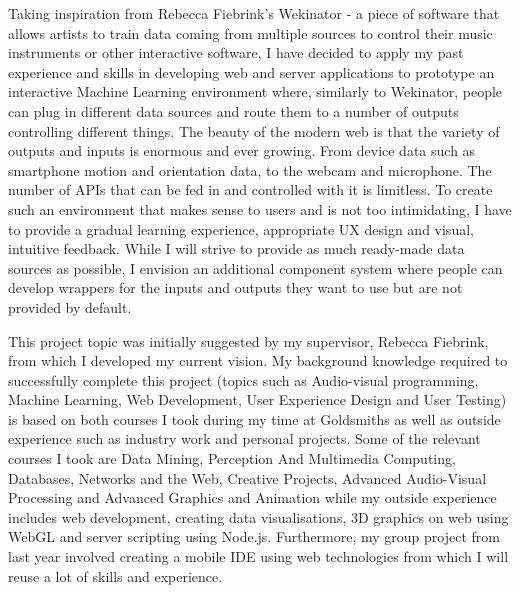 \documentclass[a4paper, 11pt]{article}
\begin{document}
  Taking inspiration from Rebecca Fiebrink's Wekinator \cite{wekinator} - a piece of software that allows artists to train data coming from multiple sources to control their music instruments or other interactive software, I have decided to apply my past experience and skills in developing web and server applications to prototype an interactive Machine Learning environment where, similarly to Wekinator, people can plug in different data sources and route them to a number of outputs controlling different things. The beauty of the modern web is that the variety of outputs and inputs is enormous and ever growing. From device data such as smartphone motion and orientation data, to the webcam and microphone. The number of APIs that can be fed in and controlled with it is limitless. To create such an environment that makes sense to users and is not too intimidating, I have to provide a gradual learning experience, appropriate UX design and visual, intuitive feedback. While I will strive to provide as much ready-made data sources as possible, I envision an additional component system where people can develop wrappers for the inputs and outputs they want to use but are not provided by default.

  This project topic was initially suggested by my supervisor, Rebecca Fiebrink, from which I developed my current vision. My background knowledge required to successfully complete this project (topics such as Audio-visual programming, Machine Learning, Web Development, User Experience Design and User Testing) is based on both courses I took during my time at Goldsmiths as well as outside experience such as industry work and personal projects. Some of the relevant courses I took are Data Mining, Perception And Multimedia Computing, Databases, Networks and the Web, Creative Projects, Advanced Audio-Visual Processing and Advanced Graphics and Animation while my outside experience includes web development, creating data visualisations, 3D graphics on web using WebGL and server scripting using Node.js. Furthermore, my group project from last year involved creating a mobile IDE using web technologies from which I will reuse a lot of skills and experience.
\end{document}
